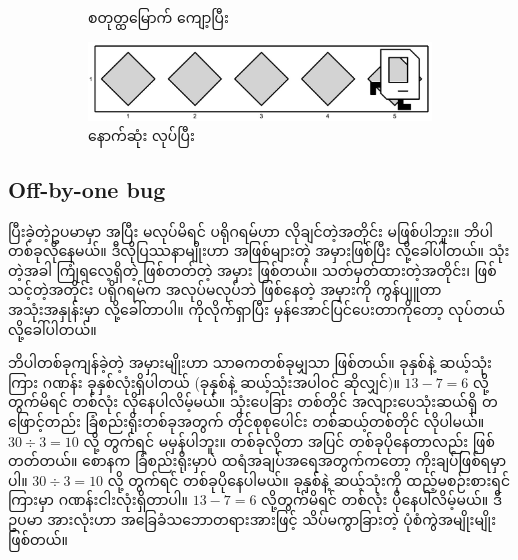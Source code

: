 \begin{figure}[thb!]
\begin{subfigure}[t]{{\figpctw}\textwidth}
        \caption{စတုတ္ထမြောက် ကျော့ပြီး}    
    \end{subfigure}
    \begin{subfigure}[t]{{\figpctw}\textwidth}
        \includegraphics[scale=0.15]{images/ch02/mrofb/after.jpg}
        \caption{နောက်ဆုံး  လုပ်ပြီး}    
    \end{subfigure}
    \caption{}
    \label{fig:mrofb_iters}
\end{figure}

\subsection*{Off-by-one bug}

ပြီးခဲ့တဲ့ဥပမာမှာ   အပြီး  မလုပ်မိရင် ပရိုဂရမ်ဟာ လိုချင်တဲ့အတိုင်း မဖြစ်ပါဘူး။  ဘိပါတစ်ခုလိုနေမယ်။ ဒီလိုပြဿနာမျိုးဟာ အဖြစ်များတဲ့ အမှားဖြစ်ပြီး  လို့ခေါ်ပါတယ်။  သုံးတဲ့အခါ ကြုံရလေ့ရှိတဲ့ ဖြစ်တတ်တဲ့ အမှား  ဖြစ်တယ်။ သတ်မှတ်ထားတဲ့အတိုင်း၊ ဖြစ်သင့်တဲ့အတိုင်း ပရိုဂရမ်က အလုပ်မလုပ်ဘဲ ဖြစ်နေတဲ့ အမှားကို ကွန်ပျူတာအသုံးအနှုန်းမှာ  လို့ခေါ်တာပါ။  ကိုလိုက်ရှာပြီး မှန်အောင်ပြင်ပေးတာကိုတော့  လုပ်တယ်လို့ခေါ်ပါတယ်။

ဘိပါတစ်ခုကျန်ခဲ့တဲ့ အမှားမျိုးဟာ  သာဓကတစ်ခုမျှသာ ဖြစ်တယ်။ ခုနှစ်နဲ့ ဆယ့်သုံးကြား ဂဏန်း ခုနှစ်လုံးရှိပါတယ် (ခုနှစ်နဲ့ ဆယ့်သုံးအပါဝင် ဆိုလျှင်)။  \(13 - 7 = 6\) လို့တွက်မိရင် တစ်လုံး လိုနေပါလိမ့်မယ်။ သုံးပေခြား တစ်တိုင် အလျားပေသုံးဆယ်ရှိ တဖြောင့်တည်း ခြံစည်းရိုးတစ်ခုအတွက် တိုင်စုစုပေါင်း တစ်ဆယ့်တစ်တိုင် လိုပါမယ်။ \(30 \div 3 = 10\) လို့ တွက်ရင် မမှန်ပါဘူး။ တစ်ခုလိုတာ အပြင် တစ်ခုပိုနေတာလည်း ဖြစ်တတ်တယ်။ စောနက ခြံစည်းရိုးမှာပဲ ထရံအချပ်အရေအတွက်ကတော့ ကိုးချပ်ဖြစ်ရမှာပါ။ \(30 \div 3 = 10\) လို့ တွက်ရင် တစ်ခုပိုနေပါမယ်။ ခုနှစ်နဲ့ ဆယ့်သုံးကို ထည့်မစဉ်းစားရင် ကြားမှာ ဂဏန်းငါးလုံးရှိတာပါ။ \(13 - 7 = 6\) လို့တွက်မိရင် တစ်လုံး ပိုနေပါလိမ့်မယ်။ ဒီ ဥပမာ အားလုံးဟာ အခြေခံသဘောတရားအားဖြင့် သိပ်မကွာခြားတဲ့  ပုံစံကွဲအမျိုးမျိုး ဖြစ်တယ်။

